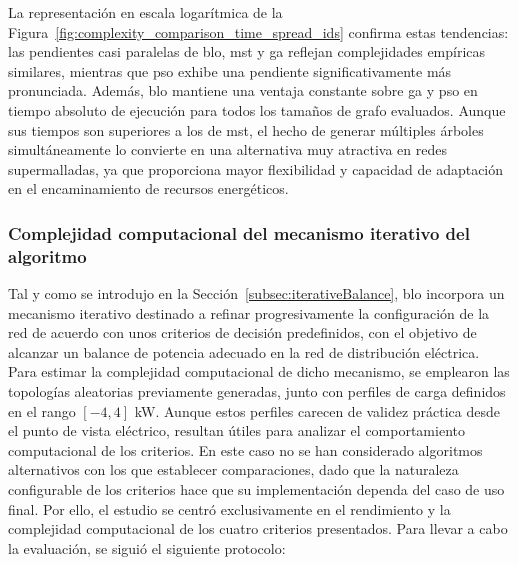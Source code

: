 La representación en escala logarítmica de la Figura~\ref{fig:complexity_comparison_time_spread_ids} confirma estas tendencias: las pendientes casi paralelas de \gls{blo}, \gls{mst} y \gls{ga} reflejan complejidades empíricas similares, mientras que \gls{pso} exhibe una pendiente significativamente más pronunciada. Además, \gls{blo} mantiene una ventaja constante sobre \gls{ga} y \gls{pso} en tiempo absoluto de ejecución para todos los tamaños de grafo evaluados. Aunque sus tiempos son superiores a los de \gls{mst}, el hecho de generar múltiples árboles simultáneamente lo convierte en una alternativa muy atractiva en redes supermalladas, ya que proporciona mayor flexibilidad y capacidad de adaptación en el encaminamiento de recursos energéticos.


\subsubsection{Complejidad computacional del mecanismo iterativo del algoritmo}
\label{subsubsec:ccomplexIter}

Tal y como se introdujo en la Sección~\ref{subsec:iterativeBalance}, \gls{blo} incorpora un mecanismo iterativo destinado a refinar progresivamente la configuración de la red de acuerdo con unos criterios de decisión predefinidos, con el objetivo de alcanzar un balance de potencia adecuado en la red de distribución eléctrica. Para estimar la complejidad computacional de dicho mecanismo, se emplearon las topologías aleatorias previamente generadas, junto con perfiles de carga definidos en el rango \([-4,4]\) kW. Aunque estos perfiles carecen de validez práctica desde el punto de vista eléctrico, resultan útiles para analizar el comportamiento computacional de los criterios. En este caso no se han considerado algoritmos alternativos con los que establecer comparaciones, dado que la naturaleza configurable de los criterios hace que su implementación dependa del caso de uso final. Por ello, el estudio se centró exclusivamente en el rendimiento y la complejidad computacional de los cuatro criterios presentados.  Para llevar a cabo la evaluación, se siguió el siguiente protocolo:


